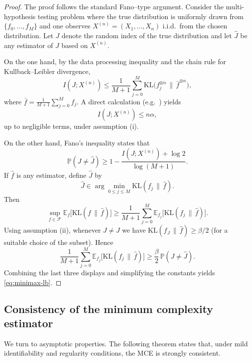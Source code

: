 \documentclass[12pt]{article}
\numberwithin{equation}{section}
\begin{document}
	\begin{proof}
		The proof follows the standard Fano--type argument. Consider the
		multi-hypothesis testing problem where the true distribution is
		uniformly drawn from $\{f_0,\ldots,f_M\}$ and one observes
		$X^{(n)}=(X_1,\ldots,X_n)$ i.i.d.\ from the chosen distribution.
		Let $J$ denote the random index of the true distribution and let
		$\widehat{J}$ be any estimator of $J$ based on $X^{(n)}$.
		
		On the one hand, by the data processing inequality and the chain rule
		for Kullback--Leibler divergence,
		\[
		I(J;X^{(n)})
		\le \frac{1}{M+1}\sum_{j=0}^M
		\mathrm{KL}\big(f_j^{\otimes n}\,\|\,\bar{f}^{\otimes n}\big),
		\]
		where $\bar{f} = \frac{1}{M+1}\sum_{j=0}^M f_j$.
		A direct calculation (e.g.\ \citealp{Tsybakov2009}) yields
		\[
		I(J;X^{(n)})
		\le n\alpha,
		\]
		up to negligible terms, under assumption (i).
		
		On the other hand, Fano's inequality states that
		\[
		\mathbb{P}(J\ne\widehat{J})
		\ge 1 - \frac{I(J;X^{(n)})+\log 2}{\log(M+1)}.
		\]
		If $\widehat{f}$ is any estimator, define $\widehat{J}$ by
		\[
		\widehat{J}
		\in \arg\min_{0\le j\le M} \mathrm{KL}(f_j\,\|\,\widehat{f}).
		\]
		Then
		\[
		\sup_{f\in\mathcal{F}}
		\mathbb{E}_f\big[\mathrm{KL}(f\,\|\,\widehat{f})\big]
		\ge \frac{1}{M+1}
		\sum_{j=0}^M
		\mathbb{E}_{f_j}\big[\mathrm{KL}(f_j\,\|\,\widehat{f})\big].
		\]
		Using assumption (ii), whenever $\widehat{J}\ne J$ we have
		$\mathrm{KL}(f_J\,\|\,\widehat{f})\ge \beta/2$ (for a suitable choice
		of the subset). Hence
		\[
		\frac{1}{M+1}
		\sum_{j=0}^M
		\mathbb{E}_{f_j}\big[\mathrm{KL}(f_j\,\|\,\widehat{f})\big]
		\ge \frac{\beta}{2}\,
		\mathbb{P}(J\ne\widehat{J}).
		\]
		Combining the last three displays and simplifying the constants yields
		\eqref{eq:minimax-lb}.
	\end{proof}
	
	\subsection{Consistency of the minimum complexity estimator}
	
	We turn to asymptotic properties.  The following theorem states that,
	under mild identifiability and regularity conditions, the MCE is
	strongly consistent.
	
\end{document}
